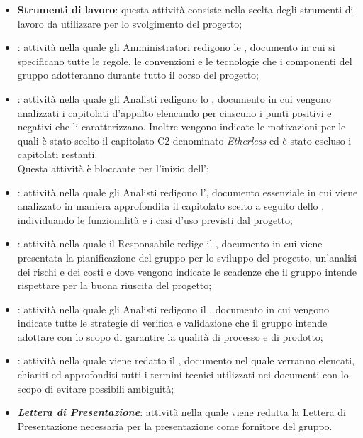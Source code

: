 \begin{itemize}
	\item \textbf{Strumenti di lavoro}: questa attività consiste nella scelta degli strumenti di lavoro da utilizzare per lo svolgimento del progetto;
	\item \textbf{\textit{\NdP{}}}: attività nella quale gli Amministratori redigono le \NdP{}, documento in cui si specificano tutte le regole, le convenzioni e le tecnologie che i componenti del gruppo adotteranno durante tutto il corso del progetto;
	\item \textbf{\textit{\SdF{}}}: attività nella quale gli Analisti redigono lo \SdF, documento in cui vengono analizzati i capitolati d'appalto elencando per ciascuno i punti positivi e negativi che li caratterizzano. Inoltre vengono indicate le motivazioni per le quali è stato scelto il capitolato C2 denominato \textit{Etherless} ed è stato escluso i capitolati restanti. \\
	Questa attività è bloccante per l'inizio dell'\AdR{};
	\item \textbf{\textit{\AdR{}}}: attività nella quale gli Analisti redigono l'\AdR, documento essenziale in cui viene analizzato in maniera approfondita il capitolato scelto a seguito dello \SdF{}, individuando le funzionalità e i casi d'uso previsti dal progetto;
	\item \textbf{\textit{\PdP{}}}: attività nella quale il Responsabile redige il \PdP, documento in cui viene presentata la pianificazione del gruppo per lo sviluppo del progetto, un'analisi dei rischi e dei costi e dove vengono indicate le scadenze che il gruppo intende rispettare per la buona riuscita del progetto;
	\item \textbf{\textit{\PdQ{}}}: attività nella quale gli Analisti redigono il \PdQ, documento in cui vengono indicate tutte le strategie di verifica e validazione che il gruppo intende adottare con lo scopo di garantire la qualità di processo e di prodotto;
	\item \textbf{\textit{\Glossario{}}}: attività nella quale viene redatto il \Glossario, documento nel quale verranno elencati, chiariti ed approfonditi tutti i termini tecnici utilizzati nei documenti con lo scopo di evitare possibili ambiguità;
	\item \textbf{\textit{Lettera di Presentazione}}: attività nella quale viene redatta la Lettera di Presentazione necessaria per la presentazione come fornitore del gruppo.
\end{itemize}

